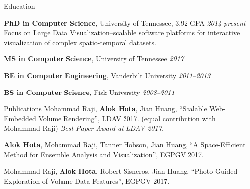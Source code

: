 \documentclass{resume} %
\begin{document}

\begin{rSection}{Education}

{{\bf PhD in Computer Science}, University of Tennessee, 3.92 GPA} \hfill {\em 2014-present} \\ 
Focus on Large Data Visualization--scalable software platforms for interactive\\visualization of complex spatio-temporal datasets.

{{\bf MS in Computer Science}, University of Tennessee} \hfill {\em 2017}

{{\bf BE in Computer Engineering}, Vanderbilt University} \hfill {\em 2011--2013}

{{\bf BS in Computer Science}, Fisk University} \hfill {\em 2008--2011}

\end{rSection}


\begin{rSection}{Publications}
    Mohammad Raji, \textbf{Alok Hota}, Jian Huang, ``Scalable Web-Embedded Volume Rendering'', LDAV 2017. (equal contribution with Mohammad Raji)
    \textit{Best Paper Award at LDAV 2017.}
    
    \textbf{Alok Hota}, Mohammad Raji, Tanner Hobson, Jian Huang, ``A Space-Efficient Method for Ensemble Analysis and Visualization'', EGPGV 2017.
    
    Mohammad Raji, \textbf{Alok Hota}, Robert Sisneros, Jian Huang, ``Photo-Guided Exploration of Volume Data Features'', EGPGV 2017.
\end{rSection}

\end{document}
